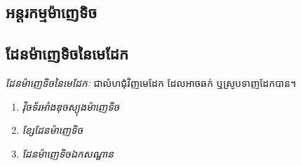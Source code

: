 \subsection{អន្តរកម្មម៉ាញេទិច}
\subsection{ដែនម៉ាញេទិចនៃមេដែក}
\begin{definition}
	\emph{\kml ដែនម៉ាញេទិចនៃមេដែកៈ} ជាលំហជុំវិញមេដែក ដែលអាចឆក់ ឬស្រូបទាញដែកបាន។
\end{definition}
\begin{enumerate}[k]
	\item \emph{\kml វ៉ិចទ័រអាំងឌុចស្យុងម៉ាញេទិច}
	\item \emph{\kml ខ្សែដែនម៉ាញេទិច}
	\item \emph{\kml ដែនម៉ាញេទិចឯកសណ្ឋាន}
\end{enumerate}
